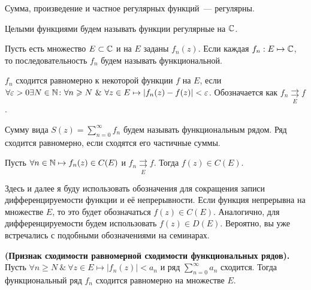 \begin{note}
    Сумма, произведение и частное регулярных функций~--- регулярны.
\end{note}

\begin{definition}
    Целыми функциями будем называть функции регулярные на \(\mathbb{C}\).
\end{definition}


Пусть есть множество \(E \subset \mathbb{C}\) и на \(E\) заданы \(f_n(z)\). Если каждая \(f_n : E \mapsto
\mathbb{C}\), то последовательность \({f_n}\) будем называть функциональной.

\begin{definition}
    \({f_n}\) сходится равномерно к некоторой функции \(f\) на \(E\), если \(\forall \epsilon \hm> 0
    \exists N \in \N \colon \forall n \ge N \ \& \ \forall z \in E \mapsto |f_n(z) - f(z)| <
    \epsilon\). Обозначается как \(f_n \mathrel{\mathop{\rightrightarrows}\limits_{E}} f\).
\end{definition}

\begin{definition}
    Сумму вида \(S(z) = \sum\limits_{n = 0}^{\infty} f_n\) будем называть функциональным рядом. Ряд
    сходится равномерно, если сходятся его частичные суммы.
\end{definition}

\begin{statement}
    Пусть \(\forall n \in \mathbb{N} \mapsto f_n(z) \in C(E)\) и \(f_n
    \mathrel{\mathop{\rightrightarrows}\limits_{E}} f\). Тогда \(f(z) \in C(E)\).
\end{statement}

\begin{anote}
    Здесь и далее я буду использовать обозначения для сокращения записи дифференцируемости функции
    и её непрерывности. Если функция непрерывна на множестве \(E\), то это будет обозначаться
    \(f(z) \in C(E)\). Аналогично, для дифференцируемости будем использовать \(f(z) \in D(E)\).
    Вероятно, вы уже встречались с подобными обозначениями на семинарах.
\end{anote}

\begin{statement}
    \textbf{(Признак сходимости равномерной сходимости функциональных рядов).} Пусть \(\forall n \ge
     N \ \& \ \forall z \in E \mapsto |f_n(z)| < a_n\) и ряд \(\sum\limits_{n = 0}^{\infty} a_n\)
     сходится. Тогда функциональный ряд \(f_n\) сходится равномерно на множестве \(E\).
\end{statement}


